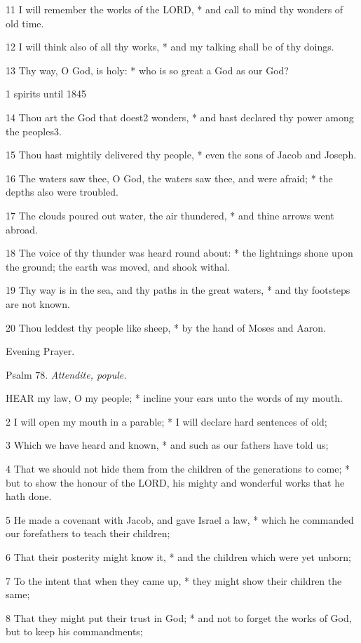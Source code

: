 11 I will remember the works of the LORD, * and call
to mind thy wonders of old time.

12 I will think also of all thy works, * and my talking
shall be of thy doings.

13 Thy way, O God, is holy: * who is so great a God as
our God?

1 spirits
until 1845

14 Thou art the God that doest2 wonders, * and hast declared
thy power among the peoples3.

15 Thou hast mightily delivered thy people, * even
the sons of Jacob and Joseph.

16 The waters saw thee, O God, the waters saw thee,
and were afraid; * the depths also were troubled.

17 The clouds poured out water, the air thundered,
* and thine arrows went abroad.

18 The voice of thy thunder was heard round about:
* the lightnings shone upon the ground; the earth was moved, and shook
withal.

19 Thy way is in the sea, and thy paths in the great
waters, * and thy footsteps are not known.

20 Thou leddest thy people like sheep, * by the hand
of Moses and Aaron. 

Evening
Prayer.

Psalm
78. \emph{Attendite, popule.}

HEAR
my law, O my people; * incline your ears unto the words of my mouth.

2 I will open my mouth in a parable; * I will declare
hard sentences of old;

3 Which we have heard and known, * and such as our
fathers have told us;

4 That we should not hide them from the children of
the generations to come; * but to show the honour of the LORD,
his mighty and wonderful works that he hath done.

5 He made a covenant with Jacob, and gave Israel a
law, * which he commanded our forefathers to teach their children;

6 That their posterity might know it, * and the children
which were yet unborn;

7 To the intent that when they came up, * they might
show their children the same;

8 That they might put their trust in God; * and not
to forget the works of God, but to keep his commandments;


